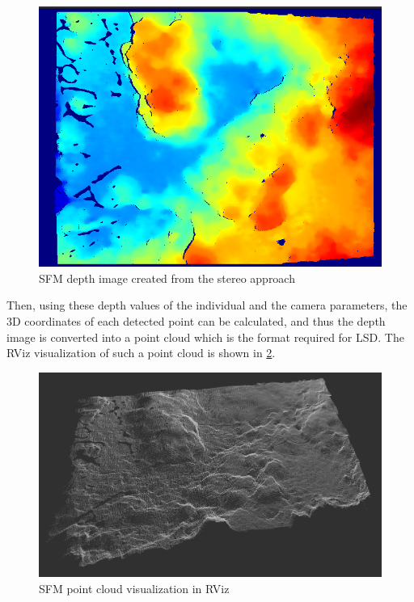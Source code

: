 \begin{figure}[h]
\centering
\includegraphics[scale=0.45]{images/system_overview/sfm_depth_image.png}
\caption{SFM depth image created from the stereo approach}
\label{fig:sfm_depth_image}
\end{figure}

Then, using these depth values of the individual and the camera parameters, the 3D coordinates of each detected point can be calculated, and thus the depth image is converted into a point cloud which is the format required for LSD. The RViz visualization of such a point cloud is shown in \cref{fig:sfm_point_cloud}.


\begin{figure}[h]
\centering
\includegraphics[scale=0.2]{images/system_overview/sfm_depth_map.png}
\caption{SFM point cloud visualization in RViz}
\label{fig:sfm_point_cloud}
\end{figure}

